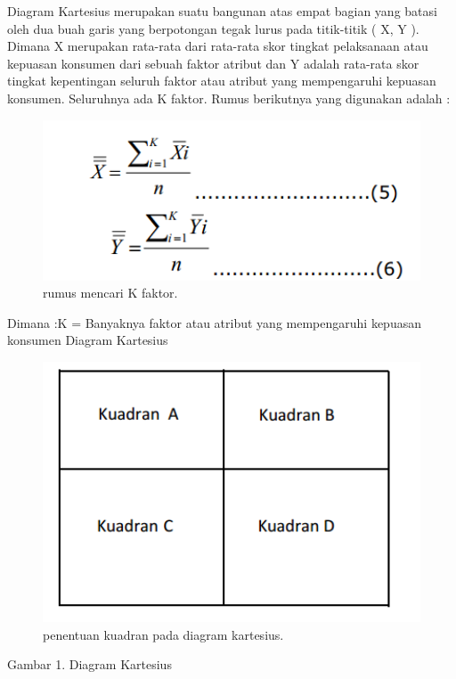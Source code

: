 Diagram Kartesius merupakan suatu bangunan atas empat bagian yang batasi oleh dua buah garis yang berpotongan tegak lurus pada titik-titik (  X, Y ). 
Dimana X merupakan rata-rata dari rata-rata skor tingkat pelaksanaan atau kepuasan konsumen dari sebuah faktor atribut 
dan Y adalah rata-rata skor tingkat kepentingan seluruh faktor atau atribut yang mempengaruhi kepuasan konsumen.
Seluruhnya ada K faktor. Rumus berikutnya yang digunakan adalah :
\begin{figure}[ht]
	\centerline{\includegraphics[width=1\textwidth]{figures/rahmi2.PNG}}
	\caption{rumus mencari K faktor.}
	\label{rahmi2}
	\end{figure}

Dimana :K = Banyaknya faktor atau atribut yang mempengaruhi kepuasan konsumen 
Diagram Kartesius	
\begin{figure}[ht]
	\centerline{\includegraphics[width=1\textwidth]{figures/rahmi3.PNG}}
	\caption{penentuan kuadran pada diagram kartesius.}
	\label{rahmi3}
	\end{figure}

Gambar 1. Diagram Kartesius



